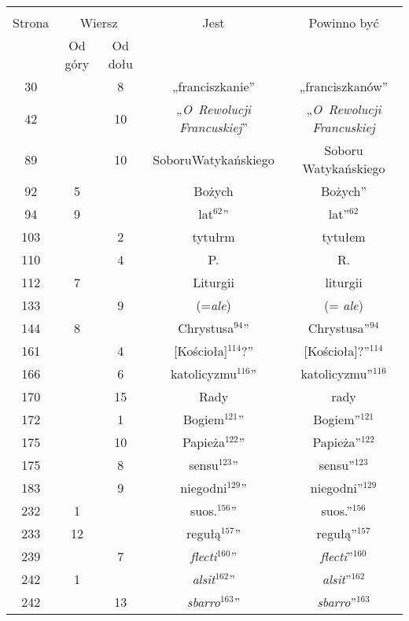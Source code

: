 \documentclass[a4paper,11pt]{article}
\begin{document}
\begin{center}

  \begin{tabular}{|c|c|c|c|c|}
    \hline
    & \multicolumn{2}{c|}{} & & \\
    Strona & \multicolumn{2}{c|}{Wiersz} & Jest
                              & Powinno być \\ \cline{2-3}
    & Od góry & Od dołu & & \\
    \hline
    30  & &  8 & „franciszkanie” & „franciszkanów” \\
    42  & & 10 & „\emph{O~Rewolucji Francuskiej}”
           & „\emph{O~Rewolucji Francuskiej} \\
    89  & & 10 & SoboruWatykańskiego & Soboru Watykańskiego \\
    92  &  5 & & Bożych & Bożych” \\
    94  &  9 & & lat$^{ 62 }$” & lat”$^{ 62 }$ \\
    103 & &  2 & tytułrm & tytułem \\
    110 & &  4 & P. & R. \\
    112 &  7 & & Liturgii & liturgii \\
    133 & &  9 & (=\emph{ale}) & (= \emph{ale}) \\
    144 &  8 & & Chrystusa$^{ 94 }$” & Chrystusa”$^{ 94 }$\\
    161 & &  4 & [Kościoła]$^{ 114 }$?” & [Kościoła]?”$^{ 114 }$ \\
    166 & &  6 & katolicyzmu$^{ 116 }$” & katolicyzmu”$^{ 116 }$ \\
    170 & & 15 & Rady & rady \\
    172 & &  1 & Bogiem$^{ 121 }$” & Bogiem”$^{ 121 }$ \\
    175 & & 10 & Papieża$^{ 122 }$” & Papieża”$^{ 122 }$ \\
    175 & &  8 & sensu$^{ 123 }$” & sensu”$^{ 123 }$ \\
    183 & &  9 & niegodni$^{ 129 }$” & niegodni”$^{ 129 }$ \\
    232 &  1 & & suos.$^{ 156 }$” & suos.”$^{ 156 }$ \\
    233 & 12 & & regułą$^{ 157 }$” & regułą”$^{ 157 }$ \\
    239 & &  7 & \emph{flecti}$^{ 160 }$” & \emph{flecti}”$^{ 160 }$ \\
    242 &  1 & & \emph{alsit}$^{ 162 }$” & \emph{alsit}”$^{ 162 }$ \\
    242 & & 13 & \emph{sbarro}$^{ 163 }$” & \emph{sbarro}”$^{ 163 }$ \\

\end{tabular}
\end{center}
\end{document}
